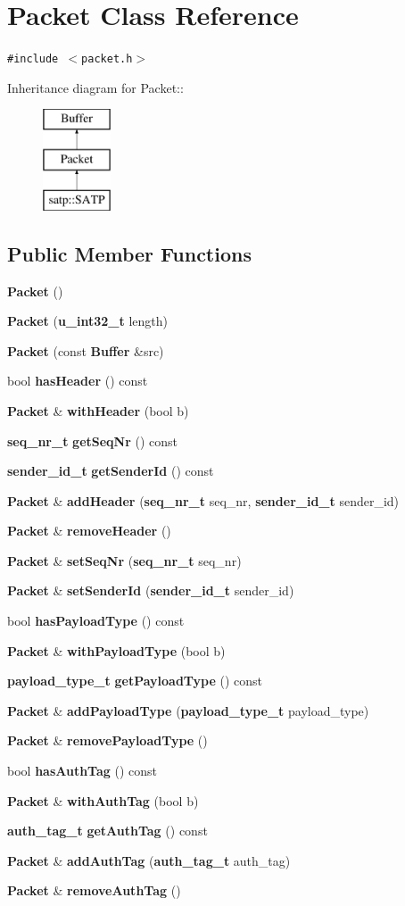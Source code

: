 \section{Packet Class Reference}
\label{classPacket}
{\tt \#include $<$packet.h$>$}

Inheritance diagram for Packet::\begin{figure}[H]
\begin{center}
\leavevmode
\includegraphics[height=3cm]{classPacket}
\end{center}
\end{figure}
\subsection*{Public Member Functions}
\begin{CompactItemize}
\item 
{\bf Packet} ()
\item 
{\bf Packet} ({\bf u\_\-int32\_\-t} length)
\item 
{\bf Packet} (const {\bf Buffer} \&src)
\item 
bool {\bf has\-Header} () const
\item 
{\bf Packet} \& {\bf with\-Header} (bool b)
\item 
{\bf seq\_\-nr\_\-t} {\bf get\-Seq\-Nr} () const
\item 
{\bf sender\_\-id\_\-t} {\bf get\-Sender\-Id} () const
\item 
{\bf Packet} \& {\bf add\-Header} ({\bf seq\_\-nr\_\-t} seq\_\-nr, {\bf sender\_\-id\_\-t} sender\_\-id)
\item 
{\bf Packet} \& {\bf remove\-Header} ()
\item 
{\bf Packet} \& {\bf set\-Seq\-Nr} ({\bf seq\_\-nr\_\-t} seq\_\-nr)
\item 
{\bf Packet} \& {\bf set\-Sender\-Id} ({\bf sender\_\-id\_\-t} sender\_\-id)
\item 
bool {\bf has\-Payload\-Type} () const
\item 
{\bf Packet} \& {\bf with\-Payload\-Type} (bool b)
\item 
{\bf payload\_\-type\_\-t} {\bf get\-Payload\-Type} () const
\item 
{\bf Packet} \& {\bf add\-Payload\-Type} ({\bf payload\_\-type\_\-t} payload\_\-type)
\item 
{\bf Packet} \& {\bf remove\-Payload\-Type} ()
\item 
bool {\bf has\-Auth\-Tag} () const
\item 
{\bf Packet} \& {\bf with\-Auth\-Tag} (bool b)
\item 
{\bf auth\_\-tag\_\-t} {\bf get\-Auth\-Tag} () const
\item 
{\bf Packet} \& {\bf add\-Auth\-Tag} ({\bf auth\_\-tag\_\-t} auth\_\-tag)
\item 
{\bf Packet} \& {\bf remove\-Auth\-Tag} ()
\end{CompactItemize}
